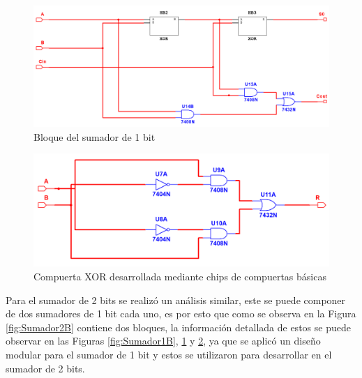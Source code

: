 \documentclass[journal]{IEEEtran}
\begin{document}
	\begin{figure}[!htb]
		\centering
		\includegraphics[scale = 0.26]{img/Sumador1BInside.png}
		\caption{Bloque del sumador de 1 bit}
		\label{fig:Sumador1BInside}
	\end{figure}
	
	\begin{figure}[!htb]
		\centering
		\includegraphics[scale = 0.28]{img/XORInside.png}
		\caption{Compuerta XOR desarrollada mediante chips de compuertas básicas}
		\label{fig:XORInside}
	\end{figure}
	
	Para el sumador de 2 bits se realizó un análisis similar, este se puede componer de dos sumadores de 1 bit cada uno, es por esto que como se observa en la Figura \ref{fig:Sumador2B} contiene dos bloques, la información detallada de estos se puede observar en las Figuras \ref{fig:Sumador1B}, \ref{fig:Sumador1BInside} y \ref{fig:XORInside}, ya que se aplicó un diseño modular para el sumador de 1 bit y estos se utilizaron para desarrollar en el sumador de 2 bits.
	
\end{document}
